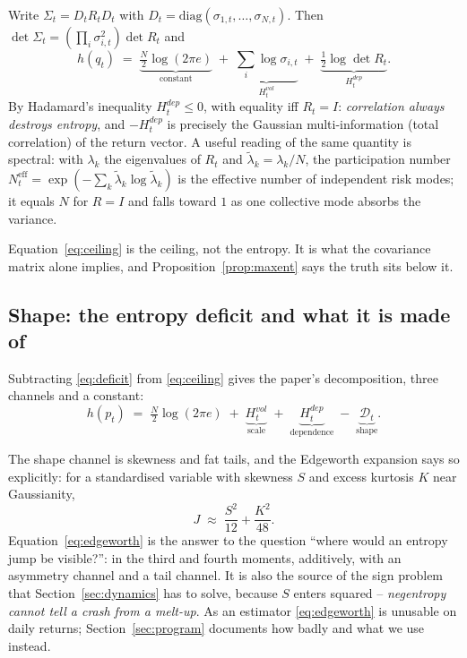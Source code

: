 \documentclass[11pt]{article}
\theoremstyle{definition}
\theoremstyle{remark}
\newcommand{\DD}{\mathcal{D}}
\begin{document}
Write $\Sigma_t = D_tR_tD_t$ with $D_t=\mathrm{diag}(\sigma_{1,t},\dots,\sigma_{N,t})$.
Then $\det\Sigma_t = \left(\prod_i\sigma_{i,t}^2\right)\det R_t$ and
\begin{equation}
\label{eq:ceiling}
h(q_t) \;=\; \underbrace{\tfrac{N}{2}\log(2\pi e)}_{\text{constant}}
\;+\; \underbrace{\sum_i \log\sigma_{i,t}}_{H^{vol}_t}
\;+\; \underbrace{\tfrac12\log\det R_t}_{H^{dep}_t}.
\end{equation}
By Hadamard's inequality $H^{dep}_t\le 0$, with equality iff $R_t=I$:
\emph{correlation always destroys entropy}, and $-H^{dep}_t$ is precisely the
Gaussian multi-information (total correlation) of the return vector. A useful
reading of the same quantity is spectral: with $\lambda_k$ the eigenvalues of
$R_t$ and $\tilde\lambda_k=\lambda_k/N$, the participation number
$N^{\text{eff}}_t=\exp\!\left(-\sum_k\tilde\lambda_k\log\tilde\lambda_k\right)$
is the effective number of independent risk modes; it equals $N$ for $R=I$ and
falls toward $1$ as one collective mode absorbs the variance.

Equation~\eqref{eq:ceiling} is the ceiling, not the entropy. It is what the
covariance matrix alone implies, and Proposition~\ref{prop:maxent} says the
truth sits below it.

\subsection{Shape: the entropy deficit and what it is made of}

Subtracting \eqref{eq:deficit} from \eqref{eq:ceiling} gives the paper's
decomposition, three channels and a constant:
\begin{equation}
\label{eq:three}
h(p_t) \;=\; \tfrac{N}{2}\log(2\pi e) \;+\; \underbrace{H^{vol}_t}_{\text{scale}} \;+\; \underbrace{H^{dep}_t}_{\text{dependence}} \;-\; \underbrace{\DD_t}_{\text{shape}}.
\end{equation}

The shape channel is skewness and fat tails, and the Edgeworth expansion says so
explicitly: for a standardised variable with skewness $S$ and excess kurtosis
$K$ near Gaussianity,
\begin{equation}
\label{eq:edgeworth}
J \;\approx\; \frac{S^2}{12} + \frac{K^2}{48}.
\end{equation}
Equation~\eqref{eq:edgeworth} is the answer to the question ``where would an
entropy jump be visible?'': in the third and fourth moments, additively, with an
asymmetry channel and a tail channel. It is also the source of the sign problem
that Section~\ref{sec:dynamics} has to solve, because $S$ enters squared --
\emph{negentropy cannot tell a crash from a melt-up}. As an estimator
\eqref{eq:edgeworth} is unusable on daily returns; Section~\ref{sec:program}
documents how badly and what we use instead.
\end{document}
